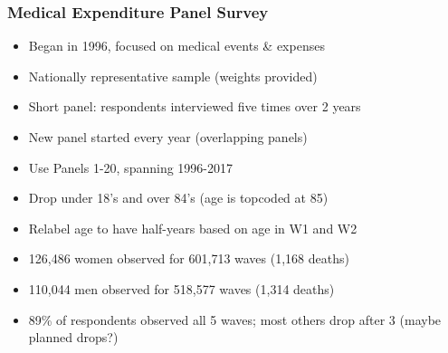 \documentclass[aspectratio=169]{beamer}
\begin{document}
\begin{frame}\frametitle{Medical Expenditure Panel Survey}
\begin{itemize}
\item <1->Began in 1996, focused on medical events \& expenses

\item <1->Nationally representative sample (weights provided)

\item <1->Short panel: respondents interviewed five times over 2 years

\item <1->New panel started every year (overlapping panels)

\item <2->Use Panels 1-20, spanning 1996-2017

\item <2->Drop under 18's and over 84's (age is topcoded at 85)

\item <2->Relabel age to have half-years based on age in W1 and W2

\item <3->126,486 women observed for 601,713 waves (1,168 deaths)

\item <3->110,044 men observed for 518,577 waves (1,314 deaths)

\item <3->89\% of respondents observed all 5 waves; most others drop after 3 (maybe planned drops?)

\end{itemize}
\end{frame}
\end{document}
